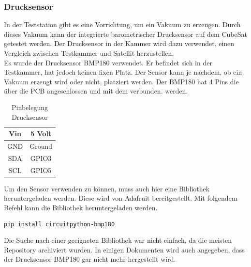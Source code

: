 \subsubsection{Drucksensor}
In der Teststation gibt es eine Vorrichtung, um ein Vakuum zu erzeugen. Durch dieses Vakuum kann der integrierte barometrischer Drucksensor auf dem CubeSat getestet werden. Der Drucksensor in der Kammer wird dazu verwendet, einen Vergleich zwischen Testkammer und Satellit herzustellen.\\
\vspace{3mm}
Es wurde der Drucksensor BMP180\autocite{BMP180} verwendet. Er befindet sich in der Testkammer, hat jedoch keinen fixen Platz. Der Sensor kann je nachdem, ob ein Vakuum erzeugt wird oder nicht, platziert werden. Der BMP180 hat 4 Pins die über die PCB angeschlossen und mit dem \raspi verbunden. werden.\\
\vspace{3mm}
\begin{table}[h]
    \centering
    \begin{tabular}{ | c | c | } 
  \hline
   Vin & 5 Volt\\ 
  \hline
   GND & Ground\\ 
  \hline
   SDA & GPIO3 \\ 
  \hline
   SCL & GPIO5 \\ 
  \hline
\end{tabular}
    \caption{Pinbelegung Drucksensor}
\end{table}
\vspace{3mm}
Um den Sensor verwenden zu können, muss auch hier eine Bibliothek heruntergeladen werden. Diese wird von Adafruit bereitgestellt. Mit folgendem Befehl kann die Bibliothek\autocite{BMP180bib} heruntergeladen werden.
\begin{verbatim}
pip install circuitpython-bmp180
\end{verbatim}
Die Suche nach einer geeigneten Bibliothek war nicht einfach, da die meisten Repository archiviert wurden. In einigen Dokumenten wird auch angegeben, dass der Drucksensor BMP180 gar nicht mehr hergestellt wird.\\
\vspace{3mm}
